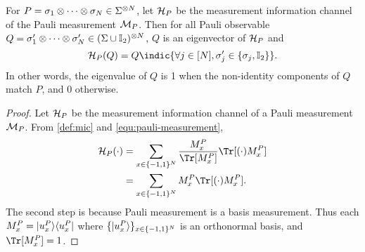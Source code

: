 \begin{lemma}
\label{lem:pauli-mic-eigen}
    For $P=\sigma_1\otimes\cdots\otimes \sigma_{{N}}\in \Sigma^{\otimes {N}}$, let $\mathcal{H}_P$ be the measurement information channel of the Pauli measurement $\mathcal{M}_P$. Then for all Pauli observable $Q=\sigma_1'\otimes\cdots\otimes \sigma_{{N}}'\in(\Sigma\cup \mathbb{I}_2)^{\otimes {N}}$, $Q$ is an eigenvector of $\mathcal{H}_P$ and
    \[
\Luders_P(Q)=Q\indic{\forall j\in[\nqubits], \sigma_j'\in\{\sigma_j,\eye_2\}}.
    \]
    In other words, the eigenvalue of ${Q}$ is 1 when the non-identity components of $Q$ match $P$, and 0 otherwise. 
\end{lemma}
\begin{proof}
 Let $\mathcal{H}_P$ be the measurement information channel of a Pauli measurement $\mathcal{M}_{P}$. From \cref{def:mic} and \cref{equ:pauli-measurement},
\begin{align*}
    \Luders_P(\cdot)&=\sum_{x\in\{-1,1\}^{\nqubits}}\frac{M_x^{P}}{\Tr[M_x^P]}\Tr[(\cdot)M_x^P]\\
    &=\sum_{x\in\{-1,1\}^{\nqubits}}M_x^{P}\Tr[(\cdot)M_x^P].
\end{align*}
The second step is because Pauli measurement is a basis measurement. Thus each $M_x^P=|{u_x^P}\rangle\langle{u_x^P}|$ where $\{|{u_x^P}\rangle\}_{x\in\{-1,1\}^{{N}}}$ is an orthonormal basis, and $\Tr[M_x^P]=1$.


\end{proof}
